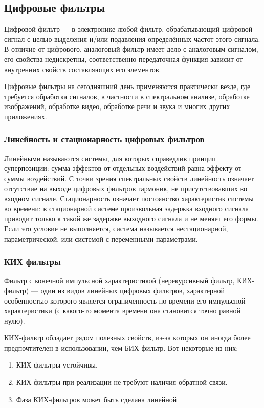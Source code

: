 \documentclass[a4paper,14pt]{extarticle}
\begin{document}
\subsection{Цифровые фильтры}

Цифровой фильтр — в электронике любой фильтр, обрабатывающий цифровой сигнал с целью выделения и/или подавления определённых частот этого сигнала. В отличие от цифрового, аналоговый фильтр имеет дело с аналоговым сигналом, его свойства недискретны, соответственно передаточная функция зависит от внутренних свойств составляющих его элементов.

Цифровые фильтры на сегодняшний день применяются практически везде, где требуется обработка сигналов, в частности в спектральном анализе, обработке изображений, обработке видео, обработке речи и звука и многих других приложениях.

\subsubsection{Линейность и стационарность цифровых фильтров}

Линейными называются системы, для которых справедлив принцип суперпозиции: сумма эффектов от отдельных воздействий равна эффекту от суммы воздействий. С точки зрения спектральных свойств линейность означает отсутствие на выходе цифровых фильтров гармоник, не присутствовавших во входном сигнале. Стационарность означает постоянство характеристик системы во времени: в стационарной системе произвольная задержка входного сигнала приводит только к такой же задержке выходного сигнала и не меняет его формы. Если это условие не выполняется, система называется нестационарной, параметрической, или системой с переменными параметрами.

\subsubsection{КИХ фильтры}
Фильтр с конечной импульсной характеристикой (нерекурсивный фильтр, КИХ-фильтр) — один из видов линейных цифровых фильтров, характерной особенностью которого является ограниченность по времени его импульсной характеристики (с какого-то момента времени она становится точно равной нулю). 

КИХ-фильтр обладает рядом полезных свойств, из-за которых он иногда более предпочтителен в использовании, чем БИХ-фильтр. Вот некоторые из них:
\begin{enumerate}
\item КИХ-фильтры устойчивы.
\item КИХ-фильтры при реализации не требуют наличия обратной связи.
\item Фаза КИХ-фильтров может быть сделана линейной
\end{enumerate}
\end{document}
